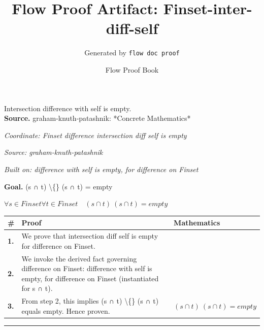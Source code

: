 \documentclass[11pt]{article}
\title{Flow Proof Artifact: Finset-inter-diff-self}
\author{Generated by \texttt{flow doc proof}}
\date{Flow Proof Book}
\theoremstyle{definition}
\begin{document}
\maketitle
Intersection difference with self is empty.\\[0.5em]
\textbf{Source.} graham-knuth-patashnik: *Concrete Mathematics*\\[0.5em]
\bigskip
{}\par
\smallskip\noindent\textit{Coordinate: Finset \cdot difference \cdot intersection diff self is empty}\par
\smallskip\noindent\textit{Source: graham-knuth-patashnik}\par
\smallskip\noindent\textit{Built on: difference with self is empty, for difference on Finset}\par
\medskip
\noindent\textbf{Goal.} (s ∩ t) \textbackslash\{\} (s ∩ t) = empty\par
\noindent$\displaystyle \forall s \in Finset \forall t \in Finset\quad (s ∩ t) \ (s ∩ t) = empty$\par
\medskip
\noindent
\begin{tabular}{@{} >{\raggedright\arraybackslash}p{} >{\raggedright\arraybackslash}p{} >{\raggedleft\arraybackslash}p{} @{}}
\textbf{\#} & \textbf{Proof} & \textbf{Mathematics} \\
\midrule
\textbf{1.} & We prove that intersection diff self is empty for difference on Finset. & \\[0.45em]
\textbf{2.} & We invoke the derived fact governing difference on Finset: difference with self is empty, for difference on Finset (instantiated for s ∩ t). & \\[0.45em]
\textbf{3.} & From step 2, this implies (s ∩ t) \textbackslash\{\} (s ∩ t) equals empty. Hence proven. & $\displaystyle (s ∩ t) \ (s ∩ t) = empty$ \\[0.45em]
\bottomrule
\end{tabular}
\label{thm:Finset-difference-intersection_diff_self_is_empty}
\par\medskip\hrule
\end{document}
